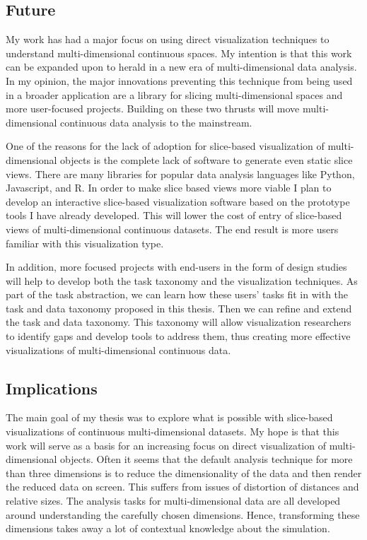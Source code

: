 \subsection{Future}

My work has had a major focus on using direct visualization techniques to
understand multi-dimensional continuous spaces. My intention is that this work
can be expanded upon to herald in a new era of multi-dimensional data analysis.
In my opinion, the major innovations preventing this technique from being used
in a broader application are a library for slicing multi-dimensional spaces and
more user-focused projects.  Building on these two thrusts will move
multi-dimensional continuous data analysis to the mainstream.

One of the reasons for the lack of adoption for slice-based visualization of
multi-dimensional objects is the complete lack of software to generate even
static slice views. There are many libraries for popular data analysis
languages like Python, Javascript, and R. In order to make slice based views
more viable I plan to develop an interactive slice-based visualization software
based on the prototype tools I have already developed. This will lower the cost
of entry of slice-based views of multi-dimensional continuous datasets. The end
result is more users familiar with this visualization type.

In addition, more focused projects with end-users in the form of design
studies~\cite{Sedlmair:2012} will help to develop both the task taxonomy and
the visualization techniques. As part of the task abstraction, we can learn how
these users' tasks fit in with the task and data taxonomy proposed in this
thesis. Then we can refine and extend the task and data taxonomy. This taxonomy
will allow visualization researchers to identify gaps and develop tools to
address them, thus creating more effective visualizations of multi-dimensional
continuous data.


\subsection{Implications}

The main goal of my thesis was to explore what is possible with slice-based
visualizations of continuous multi-dimensional datasets. My hope is that this
work will serve as a basis for an increasing focus on direct visualization of
multi-dimensional objects. Often it seems that the default analysis technique
for more than three dimensions is to reduce
the dimensionality of the
data and then render the reduced data on screen. This suffers from issues of
distortion of distances and relative sizes. The analysis tasks for
multi-dimensional data are all developed around understanding the carefully
chosen dimensions. Hence, transforming these dimensions takes away a lot of
contextual knowledge about the simulation. 

